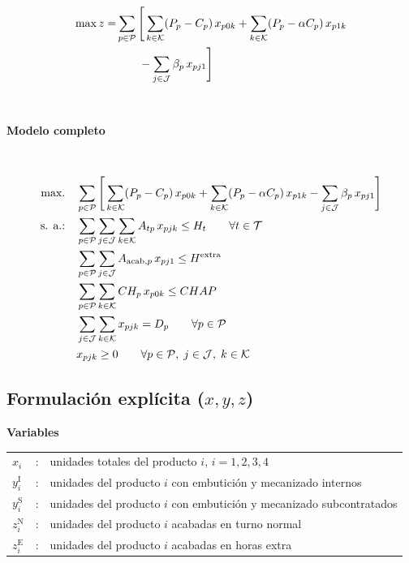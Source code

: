 \begin{align}
\max z = 
& \sum_{p \in \mathcal{P}} \Bigg[ 
\sum_{k \in \mathcal{K}} (P_p - C_p)\, x_{p0k} 
+ \sum_{k \in \mathcal{K}} (P_p - \alpha C_p)\, x_{p1k} \notag \\
& \qquad - \sum_{j \in \mathcal{J}} \beta_p \, x_{p j 1} 
\Bigg]
\end{align}
\\

\paragraph{Modelo completo}\mbox{}\\
\begin{align}
\mbox{max.} \quad & \sum_{p \in \mathcal{P}} \Bigg[ 
\sum_{k \in \mathcal{K}} (P_p - C_p)\, x_{p0k} 
+ \sum_{k \in \mathcal{K}} (P_p - \alpha C_p)\, x_{p1k} 
- \sum_{j \in \mathcal{J}} \beta_p \, x_{p j 1} \Bigg] \notag \\
\mbox{s. a.:} \quad 
& \sum_{p \in \mathcal{P}} \sum_{j \in \mathcal{J}} \sum_{k \in \mathcal{K}} A_{tp}\, x_{p j k} \leq H_t \qquad \forall t \in \mathcal{T} \notag \\
& \sum_{p \in \mathcal{P}} \sum_{j \in \mathcal{J}} A_{\text{acab},p}\, x_{p j 1} \leq H^{\text{extra}} \notag \\
& \sum_{p \in \mathcal{P}} \sum_{k \in \mathcal{K}} CH_p \, x_{p0k} \leq CHAP \notag \\
& \sum_{j \in \mathcal{J}} \sum_{k \in \mathcal{K}} x_{p j k} = D_p \qquad \forall p \in \mathcal{P} \notag \\
& x_{p j k} \geq 0 \qquad \forall p \in \mathcal{P}, \; j \in \mathcal{J}, \; k \in \mathcal{K} \notag
\end{align}








\subsection{Formulación explícita ($x,y,z$)}

\textbf{Variables}\\[0.2cm]
\begin{tabular}{l c l}
    $x_i$           & : & unidades totales del producto $i$, \; $i=1,2,3,4$ \\
    $y_i^{\mathrm{I}}$ & : & unidades del producto $i$ con embutición y mecanizado internos \\
    $y_i^{\mathrm{S}}$ & : & unidades del producto $i$ con embutición y mecanizado subcontratados \\
    $z_i^{\mathrm{N}}$ & : & unidades del producto $i$ acabadas en turno normal \\
    $z_i^{\mathrm{E}}$ & : & unidades del producto $i$ acabadas en horas extra \\
\end{tabular}

